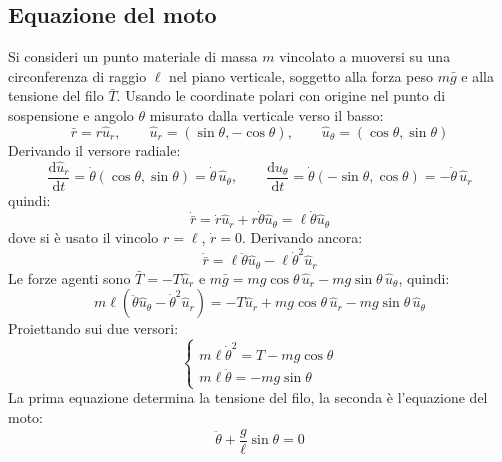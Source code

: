 \documentclass[11pt, a4paper, openright]{book}
\theoremstyle{plain}
\theoremstyle{definition}
\theoremstyle{remark}
\begin{document}
\subsection{Equazione del moto}
Si consideri un punto materiale di massa $m$ vincolato a muoversi su una circonferenza di raggio $\ell$ nel piano verticale, soggetto alla forza peso $m\bar{g}$ e alla tensione del filo $\bar{T}$. Usando le coordinate polari con origine nel punto di sospensione e angolo $\theta$ misurato dalla verticale verso il basso:
\begin{equation}
    \bar{r} = r\hat{u}_r, \qquad \hat{u}_r = (\sin\theta, -\cos\theta), \qquad \hat{u}_\theta = (\cos\theta, \sin\theta)
\end{equation}
Derivando il versore radiale:
\begin{equation}
    \frac{\mathrm{d}\hat{u}_r}{\mathrm{d}t} = \dot{\theta}(\cos\theta, \sin\theta) = \dot{\theta}\,\hat{u}_\theta, \qquad \frac{\mathrm{d}\hat{u}_\theta}{\mathrm{d}t} = \dot{\theta}(-\sin\theta, \cos\theta) = -\dot{\theta}\,\hat{u}_r
\end{equation}
quindi:
\begin{equation}
    \dot{\bar{r}} = \dot{r}\hat{u}_r + r\dot{\theta}\hat{u}_\theta = \ell\dot{\theta}\hat{u}_\theta
\end{equation}
dove si è usato il vincolo $r = \ell$, $\dot{r} = 0$. Derivando ancora:
\begin{equation}
    \ddot{\bar{r}} = \ell\ddot{\theta}\hat{u}_\theta - \ell\dot{\theta}^2\hat{u}_r
\end{equation}
Le forze agenti sono $\bar{T} = -T\hat{u}_r$ e $m\bar{g} = mg\cos\theta\,\hat{u}_r - mg\sin\theta\,\hat{u}_\theta$, quindi:
\begin{equation}
    m\ell\left(\ddot{\theta}\hat{u}_\theta - \dot{\theta}^2\hat{u}_r\right) = -T\hat{u}_r + mg\cos\theta\,\hat{u}_r - mg\sin\theta\,\hat{u}_\theta
\end{equation}
Proiettando sui due versori:
\begin{equation}
    \begin{cases}
        m\ell\dot{\theta}^2 = T - mg\cos\theta \\
        m\ell\ddot{\theta} = -mg\sin\theta
    \end{cases}
\end{equation}
La prima equazione determina la tensione del filo, la seconda è l'equazione del moto:
\begin{equation}
    \ddot{\theta} + \frac{g}{\ell}\sin\theta = 0
\end{equation}
\end{document}
